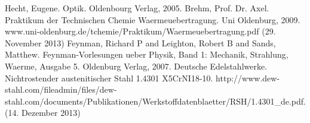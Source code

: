 \pagebreak
\begin{thebibliography}{9}
 Hecht, Eugene. Optik. Oldenbourg Verlag, 2005.
 Brehm, Prof. Dr. Axel. Praktikum der Technischen Chemie Waermeuebertragung. Uni Oldenburg, 2009. www.uni-oldenburg.de/tchemie/Praktikum/Waermeuebertragung.pdf (29. November 2013)
Feynman, Richard P and Leighton, Robert B and Sands, Matthew. Feynman-Vorlesungen ueber Physik, Band 1: Mechanik, Strahlung, Waerme, Ausgabe 5. Oldenburg Verlag, 2007.
 Deutsche Edelstahlwerke. Nichtrostender austenitischer Stahl 1.4301 X5CrNI18-10. http://www.dew-stahl.com/fileadmin/files/dew-stahl.com/documents/Publikationen/Werkstoffdatenblaetter/RSH/1.4301_de.pdf. (14. Dezember 2013)
\end{thebibliography}